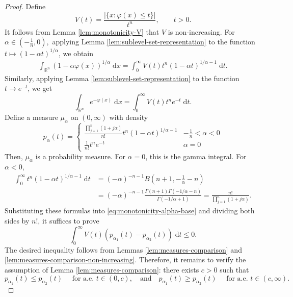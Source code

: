 \documentclass[11pt]{amsart}
\newcommand{\R}{{\mathbb R}}
\theoremstyle{plain}
\theoremstyle{definition}
\theoremstyle{remark}
\begin{document}
\begin{proof}
    Define
    \[
        V(t) =\frac{|\{ x: \varphi (x)\leq t\}|}{t^n}, \qquad t > 0.
    \]
    It follows from Lemma \ref{lem:monotonicity-V} that $V$ is non-increasing.
    For $\alpha \in (-\frac{1}{n},0),$ applying Lemma \ref{lem:sublevel-set-representation} to the function $t \mapsto (1-\alpha t)^{1 / \alpha} $, we obtain
    \begin{align}
         \int_{\R^n} (1-\alpha  \varphi(x))^{1/\alpha} \;\mathrm dx
        = \int_{0}^{\infty}V(t) t^n (1 -\alpha t)^{1 / \alpha-1}  \;\mathrm dt.
    \end{align}
    Similarly, applying Lemma \ref{lem:sublevel-set-representation} to the function $t \to e^{-t}$, we get
    \[
    \int_{\mathbb{R}^n} e^{-\varphi(x)} \;\mathrm d x=\int_0^{\infty} V(t) t^ne^{-t} \;\mathrm d t.
    \]
    Define a measure $\mu_\alpha$ on $(0,\infty)$ with density
    \[
        p_\alpha (t) = \begin{cases}
            \frac{\prod_{j=1}^n(1+j \alpha)}{n!} t^n (1 -\alpha t)^{1 / \alpha-1} &-\frac{1}{n} <\alpha <0
            \\
            \frac{1}{n!} t^ne^{-t} &\alpha =0
        \end{cases}
    \]
    Then, $\mu_\alpha$ is a probability measure. For $\alpha=0$, this is the gamma integral. For $\alpha <0$,
    \begin{align}
        \int_0^{\infty} t^n(1-\alpha t)^{1 / \alpha-1} \;\mathrm d t
        & =(-\alpha)^{-n-1} B\left(n+1, -\frac{1}{\alpha}-n\right)
        \\
        &
        =(-\alpha)^{-n-1} \frac{\Gamma(n+1) \Gamma(-1 / \alpha-n)}{\Gamma(-1 / \alpha+1)}
        =\frac{n!}{\prod_{j=1}^n(1+j \alpha)} .
    \end{align}
    Substituting these formulas into \eqref{eq:monotonicity-alpha-base} and dividing both sides by $n!$, it suffices to prove
    \begin{equation} \label{eq:comparison}
        \int_{0}^{\infty} V(t) \left(p_{\alpha_1} (t) - p_{\alpha_2} (t) \right)\;\mathrm dt \leq 0.
    \end{equation}
    The desired inequality follows from Lemmas \ref{lem:measures-comparison} and \ref{lem:measures-comparison-non-increasing}.
    Therefore, it remains to verify the assumption of Lemma \ref{lem:measures-comparison}: there exists $c > 0$ such that
    \[
        p_{\alpha_1}(t) \leq p_{\alpha_2}(t) \quad \text { for a.e. } t \in(0, c),
    \quad \text{and} \quad
    p_{\alpha_1}(t) \geq p_{\alpha_2}(t) \quad \text { for a.e. } t \in(c, \infty) .
\]
\end{proof}
\end{document}
